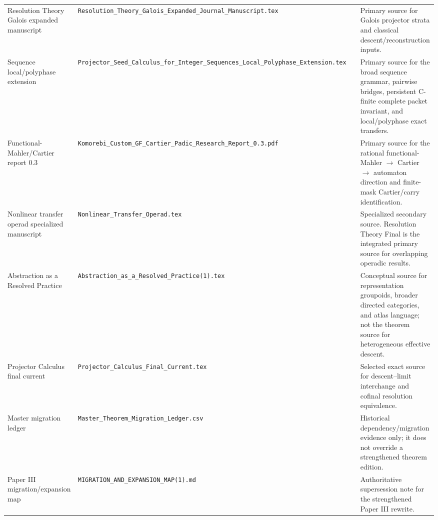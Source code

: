 \begin{longtable}{@{}L{0.18\textwidth}L{0.22\textwidth}L{0.25\textwidth}L{0.29\textwidth}@{}}
Resolution Theory Galois expanded manuscript & \nolinkurl{Resolution_Theory_Galois_Expanded_Journal_Manuscript.tex} & \texttt{} & Primary source for Galois projector strata and classical descent/reconstruction inputs.\\[3pt]
Sequence local/polyphase extension & \nolinkurl{Projector_Seed_Calculus_for_Integer_Sequences_Local_Polyphase_Extension.tex} & \texttt{} & Primary source for the broad sequence grammar, pairwise bridges, persistent C-finite complete packet invariant, and local/polyphase exact transfers.\\[3pt]
Functional-Mahler/Cartier report 0.3 & \nolinkurl{Komorebi_Custom_GF_Cartier_Padic_Research_Report_0.3.pdf} & \texttt{} & Primary source for the rational functional-Mahler \(\to\) Cartier \(\to\) automaton direction and finite-mask Cartier/carry identification.\\[3pt]
Nonlinear transfer operad specialized manuscript & \nolinkurl{Nonlinear_Transfer_Operad.tex} & \texttt{} & Specialized secondary source. Resolution Theory Final is the integrated primary source for overlapping operadic results.\\[3pt]
Abstraction as a Resolved Practice & \nolinkurl{Abstraction_as_a_Resolved_Practice(1).tex} & \texttt{} & Conceptual source for representation groupoids, broader directed categories, and atlas language; not the theorem source for heterogeneous effective descent.\\[3pt]
Projector Calculus final current & \nolinkurl{Projector_Calculus_Final_Current.tex} & \texttt{} & Selected exact source for descent--limit interchange and cofinal resolution equivalence.\\[3pt]
Master migration ledger & \nolinkurl{Master_Theorem_Migration_Ledger.csv} & \texttt{} & Historical dependency/migration evidence only; it does not override a strengthened theorem edition.\\[3pt]
Paper III migration/expansion map & \nolinkurl{MIGRATION_AND_EXPANSION_MAP(1).md} & \texttt{} & Authoritative supersession note for the strengthened Paper III rewrite.\\[3pt]

\end{longtable}
